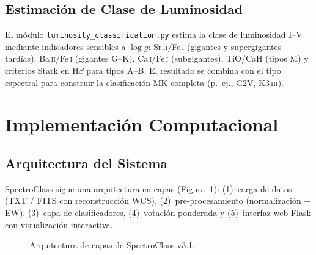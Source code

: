 \documentclass[12pt,a4paper]{article}
\begin{document}
\subsection{Estimación de Clase de Luminosidad}

El módulo \texttt{luminosity\_classification.py} estima la clase de luminosidad I--V
mediante indicadores sensibles a $\log g$:
Sr\,\textsc{ii}/Fe\,\textsc{i} (gigantes y supergigantes tardías),
Ba\,\textsc{ii}/Fe\,\textsc{i} (gigantes G--K),
Ca\,\textsc{i}/Fe\,\textsc{i} (subgigantes),
TiO/CaH (tipos M) y criterios Stark en H$\beta$ para tipos A--B.
El resultado se combina con el tipo espectral para construir la clasificación MK
completa (p.~ej., G2V, K3\,\textsc{iii}).

\section{Implementación Computacional}

\subsection{Arquitectura del Sistema}

SpectroClass sigue una arquitectura en capas (Figura~\ref{fig:arch}):
(1)~carga de datos (TXT / FITS con reconstrucción WCS), (2)~pre-procesamiento
(normalización + EW), (3)~capa de clasificadores, (4)~votación ponderada y
(5)~interfaz web Flask con visualización interactiva.

\begin{figure}[H]
  \centering
  \caption{Arquitectura de capas de SpectroClass v3.1.}
  \label{fig:arch}
\end{figure}
\end{document}
